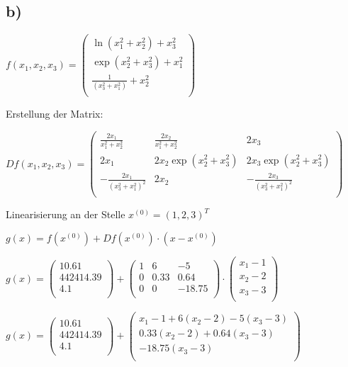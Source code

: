 \documentclass{article}
\begin{document}
\subsection*{b)}

\(f(x_1,x_2,x_3) = 
\begin{pmatrix}
\ln(x_1^2+x_2^2)+x_3^2\\
\exp(x_2^2+x_3^2)+x_1^2\\
\frac{1}{(x_3^2+x_1^2)}+x_2^2\\
\end{pmatrix}
\)

Erstellung der Matrix:

\(
Df(x_1,x_2,x_3) =
\begin{pmatrix}
\frac{2x_1}{x_1^2+x_2^2} & \frac{2x_2}{x_1^2+x_2^2} & 2x_3\\
2x_1 & 2x_2\exp(x_2^2+x_3^2) & 2x_3\exp(x_2^2+x_3^2)\\
-\frac{2x_1}{(x_3^2+x_1^2)^2} & 2x_2 & -\frac{2x_3}{(x_3^2+x_1^2)^2}\\
\end{pmatrix}
\)

Linearisierung an der Stelle \(x^{(0)} = (1,2,3)^T\)

\(g(x) = f(x^{(0)}) + Df(x^{(0)}) \cdot (x-x^{(0)})\)

\(
g(x) =
\begin{pmatrix}
10.61\\
442414.39\\
4.1\\
\end{pmatrix}
+
\begin{pmatrix}
1 & 6 & -5\\
0 & 0.33 & 0.64\\
0 & 0 & -18.75\\
\end{pmatrix}
\cdot
\begin{pmatrix}
x_1 - 1\\
x_2 - 2\\
x_3 - 3\\
\end{pmatrix}
\)

\(
g(x) =
\begin{pmatrix}
10.61\\
442414.39\\
4.1\\
\end{pmatrix}
+
\begin{pmatrix}
x_1-1+6(x_2 - 2)-5(x_3-3)\\
0.33(x_2-2)+0.64(x_3-3)\\
-18.75(x_3-3)\\
\end{pmatrix}
\)
\end{document}
